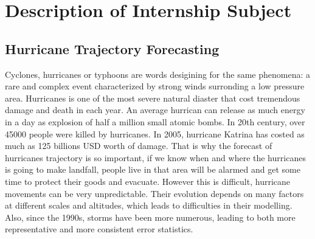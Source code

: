 \chapter{Description of Internship Subject}
\label{sec:chapter2}

\section{Hurricane Trajectory Forecasting}
\label{sec:chapter2_1}
Cyclones, hurricanes or typhoons are words desigining for the same phenomena: a rare and complex event characterized by strong winds surronding a low pressure area. Hurricanes is one of the most severe natural diaster that cost tremendous damage and death in each year. An average hurrican can release as much energy in a day as explosion of half a million small atomic bombs. In 20th century, over 45000 people were killed by hurricanes. In 2005, hurricane Katrina has costed as much as 125 billions USD worth of damage. That is why the forecast of hurricanes trajectory is so important, if we know when and where the hurricanes is going to make landfall, people live in that area will be alarmed and get some time to protect their goods and evacuate. However this is difficult, hurricane movements can be very unpredictable. Their evolution depends on many factors at different scales and altitudes, which leads to difficulties in their modelling. Also, since the 1990s, storms have been more numerous, leading to both more representative and more consistent error statistics. 

